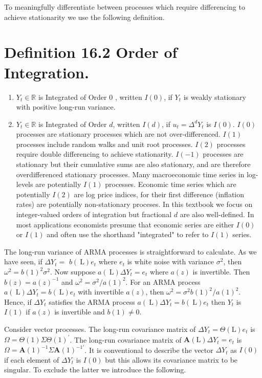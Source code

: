 \documentclass[10pt]{article}
\begin{document}
To meaningfully differentiate between processes which require differencing to achieve stationarity we use the following definition.

\section{Definition 16.2 Order of Integration.}
\begin{enumerate}
  \item $Y_{t} \in \mathbb{R}$ is Integrated of Order 0 , written $I(0)$, if $Y_{t}$ is weakly stationary with positive long-run variance.

  \item $Y_{t} \in \mathbb{R}$ is Integrated of Order $d$, written $I(d)$, if $u_{t}=\Delta^{d} Y_{t}$ is $I(0)$. $I(0)$ processes are stationary processes which are not over-differenced. $I(1)$ processes include random walks and unit root processes. $I(2)$ processes require double differencing to achieve stationarity. $I(-1)$ processes are stationary but their cumulative sums are also stationary, and are therefore overdifferenced stationary processes. Many macroeconomic time series in log-levels are potentially $I(1)$ processes. Economic time series which are potentially $I(2)$ are log price indices, for their first difference (inflation rates) are potentially non-stationary proceses. In this textbook we focus on integer-valued orders of integration but fractional $d$ are also well-defined. In most applications economists presume that economic series are either $I(0)$ or $I(1)$ and often use the shorthand "integrated" to refer to $I(1)$ series.

\end{enumerate}
The long-run variance of ARMA processes is straightforward to calculate. As we have seen, if $\Delta Y_{t}=$ $b(\mathrm{~L}) e_{t}$ where $e_{t}$ is white noise with variance $\sigma^{2}$, then $\omega^{2}=b(1)^{2} \sigma^{2}$. Now suppose $a(\mathrm{~L}) \Delta Y_{t}=e_{t}$ where $a(z)$ is invertible. Then $b(z)=a(z)^{-1}$ and $\omega^{2}=\sigma^{2} / a(1)^{2}$. For an ARMA process $a(\mathrm{~L}) \Delta Y_{t}=b(\mathrm{~L}) e_{t}$ with invertible $a(z)$, then $\omega^{2}=\sigma^{2} b(1)^{2} / a(1)^{2}$. Hence, if $\Delta Y_{t}$ satisfies the ARMA process $a(\mathrm{~L}) \Delta Y_{t}=b(\mathrm{~L}) e_{t}$ then $Y_{t}$ is $I(1)$ if $a(z)$ is invertible and $b(1) \neq 0$.

Consider vector processes. The long-run covariance matrix of $\Delta Y_{t}=\Theta(\mathrm{L}) e_{t}$ is $\Omega=\Theta(1) \Sigma \Theta(1)^{\prime}$. The long-run covariance matrix of $\boldsymbol{A}(\mathrm{L}) \Delta Y_{t}=e_{t}$ is $\Omega=\boldsymbol{A}(1)^{-1} \Sigma \boldsymbol{A}(1)^{-1 \prime}$. It is conventional to describe the vector $\Delta Y_{t}$ as $I(0)$ if each element of $\Delta Y_{t}$ is $I(0)$ but this allows its covariance matrix to be singular. To exclude the latter we introduce the following.
\end{document}
